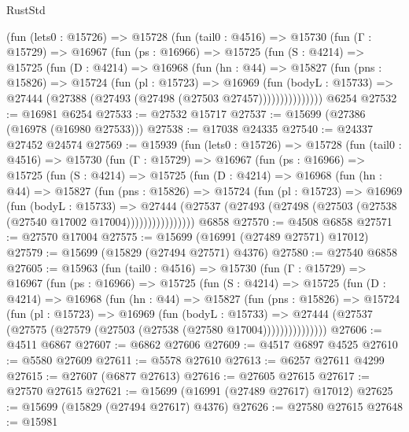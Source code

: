 \begin{lexlean}{RustStd}
\begin{coremodule}
      (fun (lets0 : @15726) =>
      @15728
        (fun (tail0 : @4516) =>
        @15730
          (fun (Γ : @15729) =>
          @16967
            (fun (ps : @16966) =>
            @15725
              (fun (S : @4214) =>
              @15725
                (fun (D : @4214) =>
                @16968
                  (fun (hn : @44) =>
                  @15827
                    (fun (pns : @15826) =>
                    @15724
                      (fun (pl : @15723) =>
                      @16969
                        (fun (bodyL : @15733) =>
                        @27444 (@27388 (@27493 (@27498 (@27503 @27457)))))))))))))))
    @6254
@27532 := @16981 @6254
@27533 := @27532 @15717
@27537 := @15699 (@27386 (@16978 (@16980 @27533)))
@27538 := @17038 @24335
@27540 := @24337 @27452 @24574
@27569 := @15939
    (fun (lets0 : @15726) =>
    @15728
      (fun (tail0 : @4516) =>
      @15730
        (fun (Γ : @15729) =>
        @16967
          (fun (ps : @16966) =>
          @15725
            (fun (S : @4214) =>
            @15725
              (fun (D : @4214) =>
              @16968
                (fun (hn : @44) =>
                @15827
                  (fun (pns : @15826) =>
                  @15724
                    (fun (pl : @15723) =>
                    @16969
                      (fun (bodyL : @15733) =>
                      @27444
                        (@27537
                          (@27493 (@27498 (@27503 (@27538 (@27540 @17002 @17004))))))))))))))))
    @6858
@27570 := @4508 @6858
@27571 := @27570 @17004
@27575 := @15699 (@16991 (@27489 @27571) @17012)
@27579 := @15699 (@15829 (@27494 @27571) @4376)
@27580 := @27540 @6858
@27605 := @15963
    (fun (tail0 : @4516) =>
    @15730
      (fun (Γ : @15729) =>
      @16967
        (fun (ps : @16966) =>
        @15725
          (fun (S : @4214) =>
          @15725
            (fun (D : @4214) =>
            @16968
              (fun (hn : @44) =>
              @15827
                (fun (pns : @15826) =>
                @15724
                  (fun (pl : @15723) =>
                  @16969
                    (fun (bodyL : @15733) =>
                    @27444 (@27537 (@27575 (@27579 (@27503 (@27538 (@27580 @17004)))))))))))))))
@27606 := @4511 @6867
@27607 := @6862 @27606
@27609 := @4517 @6897 @4525
@27610 := @5580 @27609
@27611 := @5578 @27610
@27613 := @6257 @27611 @4299
@27615 := @27607 (@6877 @27613)
@27616 := @27605 @27615
@27617 := @27570 @27615
@27621 := @15699 (@16991 (@27489 @27617) @17012)
@27625 := @15699 (@15829 (@27494 @27617) @4376)
@27626 := @27580 @27615
@27648 := @15981

\end{coremodule}
\end{lexlean}
